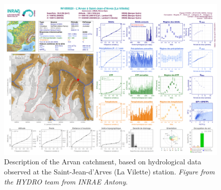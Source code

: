 \begin{figure}
\centering
\includegraphics[width=23cm]{Figures/hydro/Figure_S1.png}
\captionsetup{justification=centering}
\caption{Description of the Arvan catchment, based on hydrological data observed at the Saint-Jean-d'Arves (La Vilette) station. 
\textit{Figure from the HYDRO team from INRAE Antony}.}
\label{hydro:figA1}
\end{figure}




